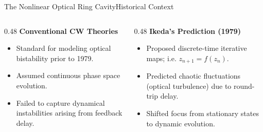 \documentclass[aspectratio=169]{beamer}
\begin{document}
\begin{frame}{The Nonlinear Optical Ring Cavity}{Historical Context}
    \begin{columns}[T, onlytextwidth]
        
        \begin{column}{0.48\textwidth}
            \textbf{Conventional CW Theories}
            \begin{itemize}
                \item Standard for modeling optical bistability prior to 1979.
                \item Assumed continuous phase space evolution.
                \item Failed to capture dynamical instabilities arising from feedback delay.
            \end{itemize}
        \end{column}
        
        \begin{column}{0.48\textwidth}
            \textbf{Ikeda's Prediction (1979)}
            \begin{itemize}
                \item Proposed discrete-time iterative maps; i.e. $z_{n+1} = f(z_n)$.
                \item Predicted chaotic fluctuations (optical turbulence) due to round-trip delay.
                \item Shifted focus from stationary states to dynamic evolution.
            \end{itemize}
        \end{column}
        
    \end{columns}

    \vspace{1em}
    
\end{frame}
\end{document}

